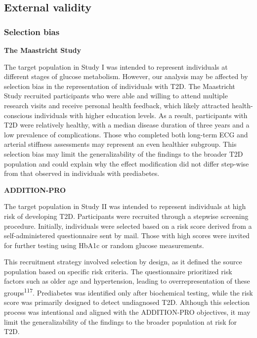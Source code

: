 \documentclass[
  a4paper,
  headsepline=true,
  open=any]{scrbook}
\begin{document}
\hypertarget{external-validity}{%
\subsection{External validity}\label{external-validity}}

\hypertarget{selection-bias}{%
\subsubsection{Selection bias}\label{selection-bias}}

\textbf{The Maastricht Study}

The target population in Study I was intended to represent individuals
at different stages of glucose metabolism. However, our analysis may be
affected by selection bias in the representation of individuals with
T2D. The Maastricht Study recruited participants who were able and
willing to attend multiple research visits and receive personal health
feedback, which likely attracted health-conscious individuals with
higher education levels. As a result, participants with T2D were
relatively healthy, with a median disease duration of three years and a
low prevalence of complications. Those who completed both long-term ECG
and arterial stiffness assessments may represent an even healthier
subgroup. This selection bias may limit the generalizability of the
findings to the broader T2D population and could explain why the effect
modification did not differ step-wise from that observed in individuals
with prediabetes.

\textbf{ADDITION-PRO}

The target population in Study II was intended to represent individuals
at high risk of developing T2D. Participants were recruited through a
stepwise screening procedure. Initially, individuals were selected based
on a risk score derived from a self-administered questionnaire sent by
mail. Those with high scores were invited for further testing using
HbA1c or random glucose measurements.

This recruitment strategy involved selection by design, as it defined
the source population based on specific risk criteria. The questionnaire
prioritized risk factors such as older age and hypertension, leading to
overrepresentation of these groups\textsuperscript{117}. Prediabetes was
identified only after biochemical testing, while the risk score was
primarily designed to detect undiagnosed T2D. Although this selection
process was intentional and aligned with the ADDITION-PRO objectives, it
may limit the generalizability of the findings to the broader population
at risk for T2D.
\end{document}
